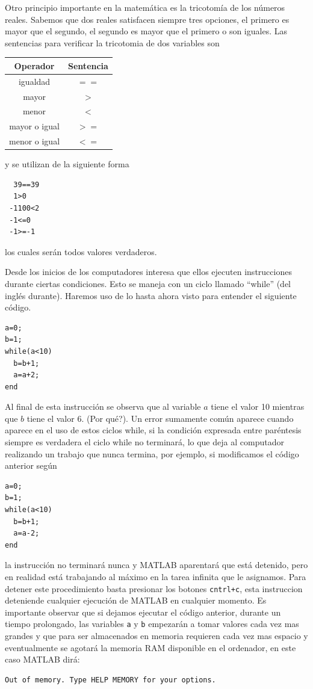 \documentclass[11pt,legalpaper]{article}
\begin{document}
Otro principio importante en la matem\'atica es la tricotom\'ia de los n\'umeros reales. Sabemos que dos reales satisfacen siempre 
tres opciones, el primero es mayor que el segundo, el segundo es mayor que el primero o son iguales. Las sentencias 
para verificar la tricotomia de dos variables son
\begin{center}
\begin{tabular}{c|c}
 \hline
 Operador 		& Sentencia \\
 \hline
  igualdad		& $==$\\
  mayor			& $>$\\	
  menor			& $<$\\
  mayor o igual		& $>=$\\
  menor o igual		& $<=$	
\end{tabular}
\end{center}
y se utilizan de la siguiente forma
\begin{lstlisting}
  39==39
  1>0
 -1100<2
 -1<=0
 -1>=-1
\end{lstlisting}
los cuales ser\'an todos valores verdaderos.

Desde los inicios de los computadores interesa que ellos ejecuten instrucciones durante ciertas condiciones. Esto 
se maneja con un ciclo llamado ``while'' (del ingl\'es durante). Haremos uso de lo hasta ahora visto para entender el 
siguiente c\'odigo.
\begin{lstlisting}
a=0;
b=1;
while(a<10)
  b=b+1;
  a=a+2;
end
\end{lstlisting}
Al final de esta instrucci\'on se observa que al variable $a$ tiene el valor 10 mientras que $b$ tiene el valor 6.
(\textquestiondown Por qu\'e?). Un error sumamente com\'un aparece cuando aparece en el uso de estos ciclos while, si la 
condici\'on expresada entre par\'entesis siempre es verdadera el ciclo while no terminar\'a, lo que deja al computador 
realizando un trabajo que nunca termina, por ejemplo, si modificamos el c\'odigo anterior seg\'un 
\begin{lstlisting}
a=0;
b=1;
while(a<10)
  b=b+1;
  a=a-2;
end
\end{lstlisting}
la instrucci\'on no terminar\'a nunca y MATLAB aparentar\'a que est\'a detenido, pero en realidad est\'a trabajando al m\'aximo 
en la tarea infinita que le asignamos. Para detener este procedimiento basta presionar los botones \texttt{cntrl+c}, esta 
instruccion deteniende cualquier ejecuci\'on de MATLAB en cualquier momento. Es importante observar que si dejamos 
ejecutar el c\'odigo anterior, durante un tiempo prolongado, las variables \texttt{a} y \texttt{b} empezar\'an a tomar valores 
cada vez mas grandes y que para ser almacenados en memoria requieren cada vez mas espacio y eventualmente se agotar\'a la memoria 
RAM disponible en el ordenador, en este caso MATLAB dir\'a:
\begin{verbatim}
Out of memory. Type HELP MEMORY for your options.
\end{verbatim}
%
\end{document}
